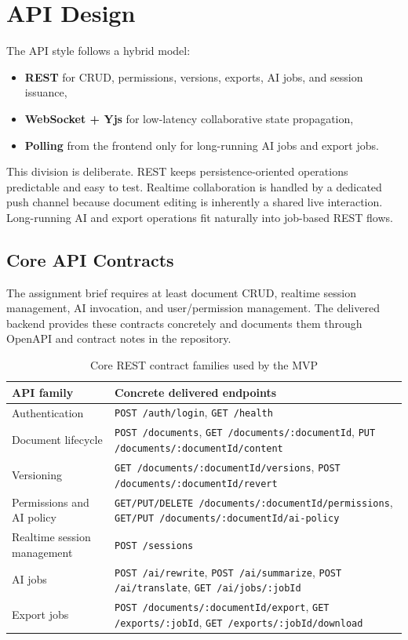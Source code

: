 \section{API Design}

The API style follows a hybrid model:

\begin{itemize}
  \item \textbf{REST} for CRUD, permissions, versions, exports, AI jobs, and session issuance,
  \item \textbf{WebSocket + Yjs} for low-latency collaborative state propagation,
  \item \textbf{Polling} from the frontend only for long-running AI jobs and export jobs.
\end{itemize}

This division is deliberate. REST keeps persistence-oriented operations predictable and easy to test.
Realtime collaboration is handled by a dedicated push channel because document editing is inherently a
shared live interaction. Long-running AI and export operations fit naturally into job-based REST flows.

\subsection{Core API Contracts}

The assignment brief requires at least document CRUD, realtime session management, AI invocation, and
user/permission management. The delivered backend provides these contracts concretely and documents them
through OpenAPI and contract notes in the repository.

\begin{table}[H]
\centering
\caption{Core REST contract families used by the MVP}
\label{tab:core-api-families}
\begin{tabularx}{\textwidth}{p{3.8cm}X}
\toprule
\textbf{API family} & \textbf{Concrete delivered endpoints} \\
\midrule
Authentication & \texttt{POST /auth/login}, \texttt{GET /health} \\
Document lifecycle & \texttt{POST /documents}, \texttt{GET /documents/:documentId}, \texttt{PUT /documents/:documentId/content} \\
Versioning & \texttt{GET /documents/:documentId/versions}, \texttt{POST /documents/:documentId/revert} \\
Permissions and AI policy & \texttt{GET/PUT/DELETE /documents/:documentId/permissions}, \texttt{GET/PUT /documents/:documentId/ai-policy} \\
Realtime session management & \texttt{POST /sessions} \\
AI jobs & \texttt{POST /ai/rewrite}, \texttt{POST /ai/summarize}, \texttt{POST /ai/translate}, \texttt{GET /ai/jobs/:jobId} \\
Export jobs & \texttt{POST /documents/:documentId/export}, \texttt{GET /exports/:jobId}, \texttt{GET /exports/:jobId/download} \\
\bottomrule
\end{tabularx}
\end{table}

